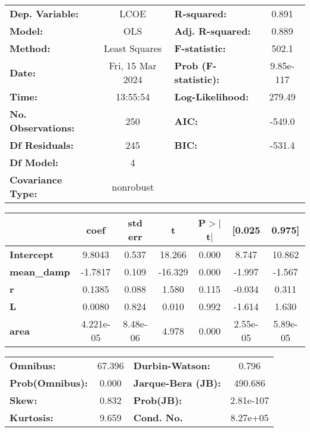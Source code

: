 \begin{center}
\begin{tabular}{lclc}
\toprule
\textbf{Dep. Variable:}    &       LCOE       & \textbf{  R-squared:         } &     0.891   \\
\textbf{Model:}            &       OLS        & \textbf{  Adj. R-squared:    } &     0.889   \\
\textbf{Method:}           &  Least Squares   & \textbf{  F-statistic:       } &     502.1   \\
\textbf{Date:}             & Fri, 15 Mar 2024 & \textbf{  Prob (F-statistic):} & 9.85e-117   \\
\textbf{Time:}             &     13:55:54     & \textbf{  Log-Likelihood:    } &    279.49   \\
\textbf{No. Observations:} &         250      & \textbf{  AIC:               } &    -549.0   \\
\textbf{Df Residuals:}     &         245      & \textbf{  BIC:               } &    -531.4   \\
\textbf{Df Model:}         &           4      & \textbf{                     } &             \\
\textbf{Covariance Type:}  &    nonrobust     & \textbf{                     } &             \\
\bottomrule
\end{tabular}
\begin{tabular}{lcccccc}
                    & \textbf{coef} & \textbf{std err} & \textbf{t} & \textbf{P$> |$t$|$} & \textbf{[0.025} & \textbf{0.975]}  \\
\midrule
\textbf{Intercept}  &       9.8043  &        0.537     &    18.266  &         0.000        &        8.747    &       10.862     \\
\textbf{mean\_damp} &      -1.7817  &        0.109     &   -16.329  &         0.000        &       -1.997    &       -1.567     \\
\textbf{r}          &       0.1385  &        0.088     &     1.580  &         0.115        &       -0.034    &        0.311     \\
\textbf{L}          &       0.0080  &        0.824     &     0.010  &         0.992        &       -1.614    &        1.630     \\
\textbf{area}       &    4.221e-05  &     8.48e-06     &     4.978  &         0.000        &     2.55e-05    &     5.89e-05     \\
\bottomrule
\end{tabular}
\begin{tabular}{lclc}
\textbf{Omnibus:}       & 67.396 & \textbf{  Durbin-Watson:     } &     0.796  \\
\textbf{Prob(Omnibus):} &  0.000 & \textbf{  Jarque-Bera (JB):  } &   490.686  \\
\textbf{Skew:}          &  0.832 & \textbf{  Prob(JB):          } & 2.81e-107  \\
\textbf{Kurtosis:}      &  9.659 & \textbf{  Cond. No.          } &  8.27e+05  \\
\bottomrule
\end{tabular}
\end{center}

